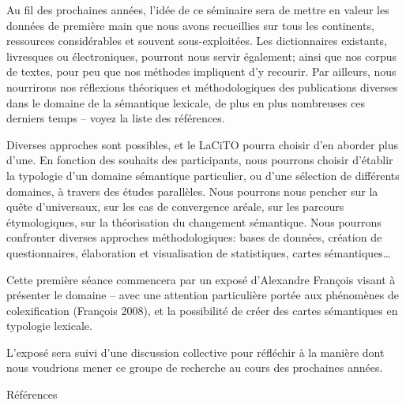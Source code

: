     
    
    Au fil des prochaines années, l'idée de ce séminaire sera de mettre en valeur les données de première main que nous avons recueillies sur tous les continents, ressources considérables et souvent sous-exploitées. Les dictionnaires existants, livresques ou électroniques, pourront nous servir également; ainsi que nos corpus de textes, pour peu que nos méthodes impliquent d'y recourir. Par ailleurs, nous nourrirons nos réflexions théoriques et méthodologiques des publications diverses dans le domaine de la sémantique lexicale, de plus en plus nombreuses ces derniers temps – voyez la liste des références.
    
    
    
    Diverses approches sont possibles, et le LaCiTO pourra choisir d'en aborder plus d'une.  En fonction des souhaits des participants, nous pourrons choisir d'établir la typologie d'un domaine sémantique particulier, ou d'une sélection de différents domaines, à travers des études parallèles. Nous pourrons nous pencher sur la quête d'universaux, sur les cas de convergence aréale, sur les parcours étymologiques, sur la théorisation du changement sémantique. Nous pourrons confronter diverses approches méthodologiques: bases de données, création de questionnaires, élaboration et visualisation de statistiques, cartes sémantiques…
    
    
    
    
    Cette première séance commencera par un exposé d'Alexandre François visant à présenter le domaine – avec une attention particulière portée aux phénomènes de colexification (François 2008), et la possibilité de créer des cartes sémantiques en typologie lexicale.  
    
    L'exposé sera suivi d'une discussion collective pour réfléchir à la manière dont nous voudrions mener ce groupe de recherche au cours des prochaines années.
    
    
    
    Références
    
